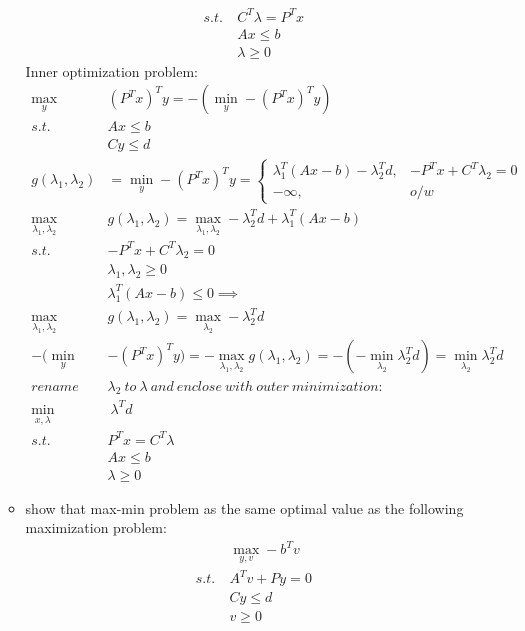 \documentclass[12pt,letter]{article}
\begin{document}
\begin{enumerate}
\begin{itemize}
\begin{align*}
      s.t.\ & C^T \lambda = P^Tx\\
      &Ax \leq b\\
      &\lambda \geq 0
    \end{align*}
    Inner optimization problem:
    \begin{align*}
      \max_y & (P^Tx)^T y = -(\min_y -(P^Tx)^T y)\\
      s.t.\ &Ax \leq b\\
             &Cy \leq d\\
      g(\lambda_1,\lambda_2) & = \min_y -(P^Tx)^T y =
                           \begin{cases}
                             \lambda_1^T(Ax-b)-\lambda_2^Td, & -P^Tx+C^T\lambda_2 = 0\\
                             -\infty, & o/w
                           \end{cases}\\
      \max_{\lambda_1,\lambda_2}\ & g(\lambda_1,\lambda_2) = \max_{\lambda_1,\lambda_2} -\lambda_2^Td + \lambda_1^T(Ax-b)\\
      s.t.\ & -P^Tx+C^T\lambda_2 = 0\\
             &\lambda_1, \lambda_2 \geq 0\\
             & \lambda_1^T(Ax-b) \leq 0 \implies\\
      \max_{\lambda_1,\lambda_2}\ & g(\lambda_1,\lambda_2) = \max_{\lambda_2} -\lambda_2^Td\\
      -(\min_y & -(P^Tx)^T y) = - \max_{\lambda_1,\lambda_2} g(\lambda_1,\lambda_2) = -(-\min_{\lambda_2} \lambda_2^Td) = \min_{\lambda_2} \lambda_2^Td\\
             rename\ &\lambda_2\ to\ \lambda\ and\ enclose\ with\ outer\ minimization:\\
      \min_{x,\lambda}&\ \lambda^Td\\
      s.t.\ &P^Tx = C^T\lambda\\
             &Ax \leq b\\
             &\lambda \geq 0
    \end{align*}
    \pagebreak
  \item show that max-min problem as the same optimal value as the following maximization problem:
    \begin{align*}
      &\max_{y,v} -b^T v\\
      s.t.\ & A^Tv + Py = 0\\
      &Cy \leq d\\
      &v \geq 0
    \end{align*}

\end{itemize}
\end{enumerate}
\end{document}
